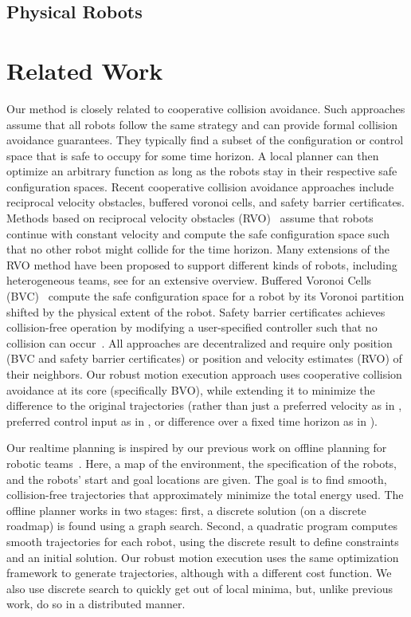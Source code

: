 \documentclass{svproc}
\begin{document}

\subsection{Physical Robots}


\section{Related Work}
\label{sec:relatedWork}

Our method is closely related to cooperative collision avoidance.
Such approaches assume that all robots follow the same strategy and can provide formal collision avoidance guarantees.
They typically find a subset of the configuration or control space that is safe to occupy for some time horizon.
A local planner can then optimize an arbitrary function as long as the robots stay in their respective safe configuration spaces.
Recent cooperative collision avoidance approaches include reciprocal velocity obstacles, buffered voronoi cells, and safety barrier certificates.
Methods based on reciprocal velocity obstacles (RVO)~\cite{RVO} assume that robots continue with constant velocity and compute the safe configuration space such that no other robot might collide for the time horizon. Many extensions of the RVO method have been proposed to support different kinds of robots, including heterogeneous teams, see \cite{epsilonCCA} for an extensive overview.
Buffered Voronoi Cells (BVC)~\cite{bufferedVoronoiCells} compute the safe configuration space for a robot by its Voronoi partition shifted by the physical extent of the robot. 
Safety barrier certificates achieves collision-free operation by modifying a user-specified controller such that no collision can occur~\cite{barrierCertificates}.
All approaches are decentralized and require only position (BVC and safety barrier certificates) or position and velocity estimates (RVO) of their neighbors.
Our robust motion execution approach uses cooperative collision avoidance at its core (specifically BVO), while extending it to minimize the difference to the original trajectories (rather than just a preferred velocity as in \cite{epsilonCCA}, preferred control input as in \cite{barrierCertificates}, or difference over a fixed time horizon as in \cite{bufferedVoronoiCells}).

Our realtime planning is inspired by our previous work on offline planning for robotic teams~\cite{crazyplanning-ieeetro}.
Here, a map of the environment, the specification of the robots, and the robots' start and goal locations are given.
The goal is to find smooth, collision-free trajectories that approximately minimize the total energy used.
The offline planner works in two stages: first, a discrete solution (on a discrete roadmap) is found using a graph search. Second, a quadratic program computes smooth trajectories for each robot, using the discrete result to define constraints and an initial solution.
Our robust motion execution uses the same optimization framework to generate trajectories, although with a different cost function.
We also use discrete search to quickly get out of local minima, but, unlike previous work, do so in a distributed manner.
\end{document}
